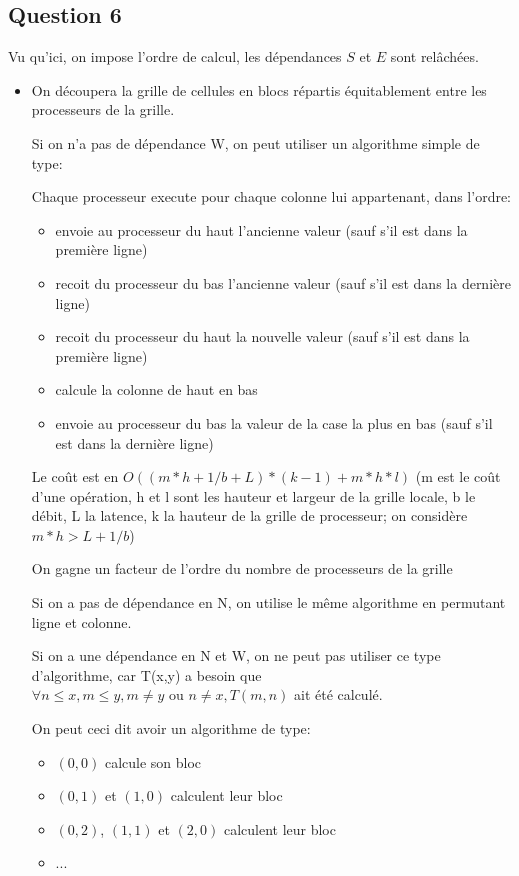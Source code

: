 \documentclass{article}
\begin{document}
\subsection*{Question 6}
Vu qu'ici, on impose l'ordre de calcul, les dépendances $S$ et $E$ sont relâchées.

\begin{itemize}
\item
On découpera la grille de cellules en blocs répartis équitablement entre les processeurs de la grille.

Si on n'a pas de dépendance W, on peut utiliser un algorithme simple de type:

Chaque processeur execute pour chaque colonne lui appartenant, dans l'ordre:
\begin{itemize}
\item envoie au processeur du haut l'ancienne valeur (sauf s'il est dans la première ligne)
\item recoit du processeur du bas l'ancienne valeur (sauf s'il est dans la dernière ligne)
\item recoit du processeur du haut la nouvelle valeur (sauf s'il est dans la première ligne)
\item calcule la colonne de haut en bas
\item envoie au processeur du bas la valeur de la case la plus en bas (sauf s'il est dans la dernière ligne)
\end{itemize}

Le coût est en $O((m*h+1/b+L)*(k-1)+m*h*l)$ (m est le coût d'une opération, h et l sont les hauteur et largeur de la grille locale, b le débit, L la latence, k la hauteur de la grille de processeur; on considère $m*h > L+1/b$) 

On gagne un facteur de l'ordre du nombre de processeurs de la grille

Si on a pas de dépendance en N, on utilise le même algorithme en permutant ligne et colonne.

Si on a une dépendance en N et W, on ne peut pas utiliser ce type d'algorithme, car T(x,y) a besoin que $\forall n \le x,m \le y, m \neq y \text{ ou } n \neq x, T(m,n)$  ait été calculé.

On peut ceci dit avoir un algorithme de type:
\begin{itemize}
\item $(0,0)$ calcule son bloc
\item $(0,1)$ et $(1,0)$ calculent leur bloc
\item $(0,2)$, $(1,1)$ et $(2,0)$ calculent leur bloc
\item ...
\end{itemize}


\end{itemize}
\end{document}
